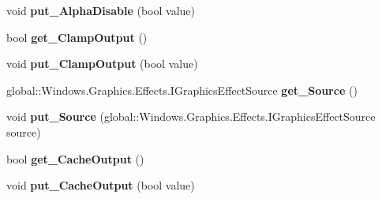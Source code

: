 \begin{DoxyCompactItemize}
\mbox{\label{class_microsoft_1_1_graphics_1_1_canvas_1_1_effects_1_1_discrete_transfer_effect_a99c4ded96e00c754eb5dedef880e7af2}} 
void {\bfseries put\+\_\+\+Alpha\+Disable} (bool value)
\item 
\mbox{\label{class_microsoft_1_1_graphics_1_1_canvas_1_1_effects_1_1_discrete_transfer_effect_a6c4b3ec17b2dba47834aa74cd044058a}} 
bool {\bfseries get\+\_\+\+Clamp\+Output} ()
\item 
\mbox{\label{class_microsoft_1_1_graphics_1_1_canvas_1_1_effects_1_1_discrete_transfer_effect_ac8ea83113fe2b3a628baec70125ead0c}} 
void {\bfseries put\+\_\+\+Clamp\+Output} (bool value)
\item 
\mbox{\label{class_microsoft_1_1_graphics_1_1_canvas_1_1_effects_1_1_discrete_transfer_effect_a5190652a2bb2f5670054722c336d45c2}} 
global\+::\+Windows.\+Graphics.\+Effects.\+I\+Graphics\+Effect\+Source {\bfseries get\+\_\+\+Source} ()
\item 
\mbox{\label{class_microsoft_1_1_graphics_1_1_canvas_1_1_effects_1_1_discrete_transfer_effect_ad2e354fa5591b5b28f5c19e4c0c8a0ca}} 
void {\bfseries put\+\_\+\+Source} (global\+::\+Windows.\+Graphics.\+Effects.\+I\+Graphics\+Effect\+Source source)
\item 
\mbox{\label{class_microsoft_1_1_graphics_1_1_canvas_1_1_effects_1_1_discrete_transfer_effect_a7108e163c3df5454f82427277401cbb9}} 
bool {\bfseries get\+\_\+\+Cache\+Output} ()
\item 
\mbox{\label{class_microsoft_1_1_graphics_1_1_canvas_1_1_effects_1_1_discrete_transfer_effect_a1f47c9bb5d537f5c821c696dce9da20b}} 
void {\bfseries put\+\_\+\+Cache\+Output} (bool value)
\item 

\end{DoxyCompactItemize}
